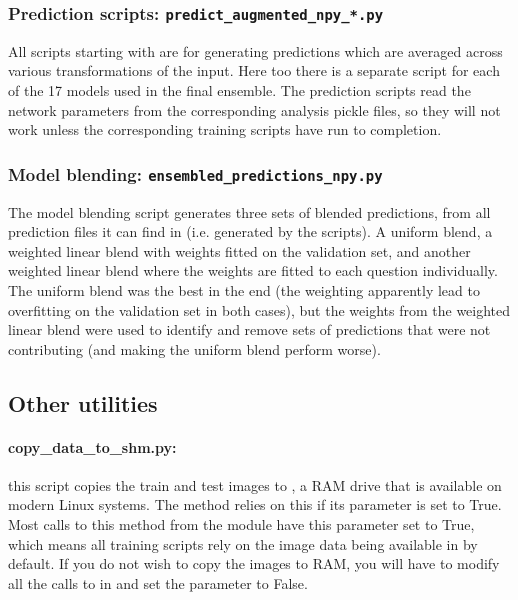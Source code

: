 \documentclass[a4paper,10pt]{article}
\begin{document}
\subsubsection{Prediction scripts: \texttt{predict\_augmented\_npy\_*.py}}

All scripts starting with  are for generating predictions which are averaged across various transformations of the input. Here too there is a separate script for each of the 17 models used in the final ensemble. The prediction scripts read the network parameters from the corresponding analysis pickle files, so they will not work unless the corresponding training scripts have run to completion.

\subsubsection{Model blending: \texttt{ensembled\_predictions\_npy.py}}

The model blending script generates three sets of blended predictions, from all prediction files it can find in  (i.e. generated by the  scripts). A uniform blend, a weighted linear blend with weights fitted on the validation set, and another weighted linear blend where the weights are fitted to each question individually. The uniform blend was the best in the end (the weighting apparently lead to overfitting on the validation set in both cases), but the weights from the weighted linear blend were used to identify and remove sets of predictions that were not contributing (and making the uniform blend perform worse).

\subsection{Other utilities}
\label{sec:other-utilities}

\paragraph{copy\_data\_to\_shm.py:} this script copies the train and test images to , a RAM drive that is available on modern Linux systems. The  method relies on this if its  parameter is set to True. Most calls to this method from the  module have this parameter set to True, which means all training scripts rely on the image data being available in  by default. If you do not wish to copy the images to RAM, you will have to modify all the calls to  in  and set the  parameter to False.
\end{document}
